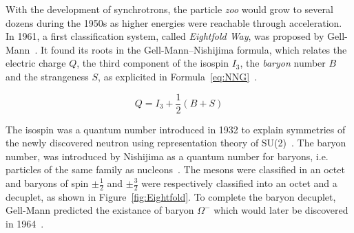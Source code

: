 	With the development of synchrotrons, the particle \textit{zoo} would grow to several dozens during the 1950s as higher energies were reachable through acceleration. In 1961, a first classification system, called \textit{Eightfold Way}, was proposed by Gell-Mann~\cite{GELLMANN1962}. It found its roots in the Gell-Mann--Nishijima formula, which relates the electric charge $Q$, the third component of the isospin $I_3$, the \textit{baryon} number $B$ and the strangeness $S$, as explicited in Formula~\ref{eq:NNG}~\cite{NISHIJIMA1953,NISHIJIMA1955,GELLMANN1956}.
	
	\begin{equation}
		\label{eq:NNG}
		Q = I_3 + \frac{1}{2}(B+S)
	\end{equation}
	
	The isospin was a quantum number introduced in 1932 to explain symmetries of the newly discovered neutron using representation theory of SU(2)~\cite{HEISENBERG1932}. The baryon number, was introduced by Nishijima as a quantum number for baryons, i.e. particles of the same family as nucleons~\cite{NISHIJIMA1953}. The mesons were classified in an octet and baryons of spin $\pm\frac{1}{2}$ and $\pm\frac{3}{2}$ were respectively classified into an octet and a decuplet, as shown in Figure~\ref{fig:Eightfold}. To complete the baryon decuplet, Gell-Mann predicted the existance of baryon $\Omega^-$ which would later be discovered in 1964~\cite{BARNES1964}.
	
